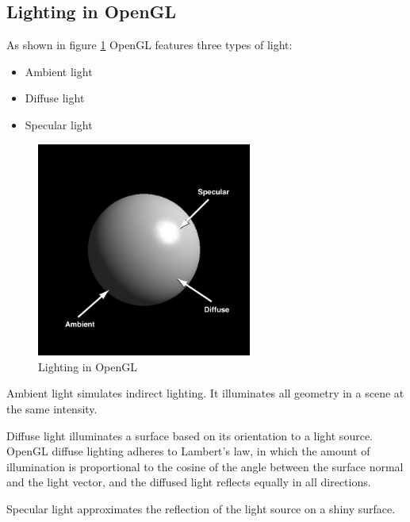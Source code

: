 \subsection{Lighting in OpenGL}
As shown in figure \ref{fig:lighting} OpenGL features three types of light:
\begin{itemize}
  \item Ambient light
  \item Diffuse light
  \item Specular light
\end{itemize}
%
\begin{figure}[!h]
  \begin{center}
    \includegraphics[width=200pt]{img/light}
    \caption{Lighting in OpenGL}
    \label{fig:lighting}
  \end{center}
\end{figure}
%
Ambient light simulates indirect lighting. It illuminates all 
geometry in a scene at the same intensity.
%

%
Diffuse light illuminates a surface based on its orientation 
to a light source. OpenGL diffuse lighting adheres to 
Lambert's law, in which the amount of illumination is proportional 
to the cosine of the angle between the surface normal and the 
light vector, and the diffused light reflects equally in 
all directions.
%

%
Specular light approximates the reflection of the light source on 
a shiny surface.
%

